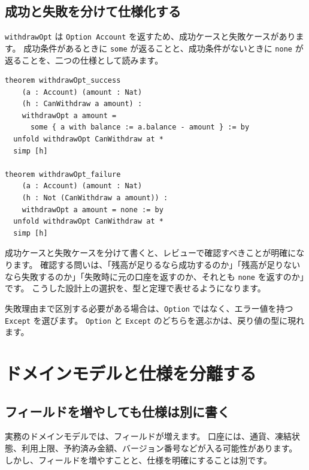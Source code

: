 \subsection{成功と失敗を分けて仕様化する}

\texttt{withdrawOpt} は \texttt{Option Account} を返すため、成功ケースと失敗ケースがあります。
成功条件があるときに \texttt{some} が返ることと、成功条件がないときに \texttt{none} が返ることを、二つの仕様として読みます。

\begin{listing}[htbp]
\begin{verbatim}
theorem withdrawOpt_success
    (a : Account) (amount : Nat)
    (h : CanWithdraw a amount) :
    withdrawOpt a amount =
      some { a with balance := a.balance - amount } := by
  unfold withdrawOpt CanWithdraw at *
  simp [h]

theorem withdrawOpt_failure
    (a : Account) (amount : Nat)
    (h : Not (CanWithdraw a amount)) :
    withdrawOpt a amount = none := by
  unfold withdrawOpt CanWithdraw at *
  simp [h]
\end{verbatim}
\caption{\texttt{withdrawOpt\_success} と \texttt{withdrawOpt\_failure}}
\label{lst:ch10_withdraw_option_spec}
\end{listing}

成功ケースと失敗ケースを分けて書くと、レビューで確認すべきことが明確になります。
確認する問いは、「残高が足りるなら成功するのか」「残高が足りないなら失敗するのか」「失敗時に元の口座を返すのか、それとも \texttt{none} を返すのか」です。
こうした設計上の選択を、型と定理で表せるようになります。

失敗理由まで区別する必要がある場合は、\texttt{Option} ではなく、エラー値を持つ \texttt{Except} を選びます。
\texttt{Option} と \texttt{Except} のどちらを選ぶかは、戻り値の型に現れます。

\section{ドメインモデルと仕様を分離する}

\subsection{フィールドを増やしても仕様は別に書く}

実務のドメインモデルでは、フィールドが増えます。
口座には、通貨、凍結状態、利用上限、予約済み金額、バージョン番号などが入る可能性があります。
しかし、フィールドを増やすことと、仕様を明確にすることは別です。


